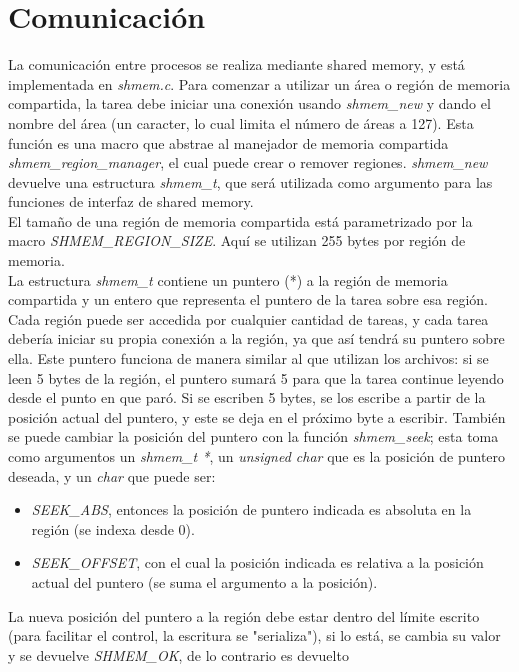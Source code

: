 \documentclass[a4paper]{article}
\begin{document}
\section{Comunicación}
La comunicación entre procesos se realiza mediante shared memory, y
está implementada en \textit{shmem.c}. Para comenzar a utilizar un área
o región de memoria compartida, la tarea debe iniciar una conexión
usando \textit{shmem\_new} y dando el nombre del área (un caracter,
lo cual limita el número de áreas a 127). Esta función es una macro
que abstrae al manejador de memoria compartida
\textit{shmem\_region\_manager}, el cual puede crear o remover
regiones. \textit{shmem\_new} devuelve una estructura
\textit{shmem\_t}, que ser\'a utilizada como argumento para las
funciones de interfaz de shared memory. \\
El tamaño de una región de memoria compartida está parametrizado
por la macro \textit{SHMEM\_REGION\_SIZE}. Aquí se utilizan 255
bytes por región de memoria. \\
La estructura \textit{shmem\_t} contiene un puntero (*) a la región
de memoria compartida y un entero que representa el puntero de la
tarea sobre esa región. Cada región puede ser accedida por
cualquier cantidad de tareas, y cada tarea
debería iniciar su propia conexión a la región, ya que así tendrá
su puntero sobre ella. Este puntero funciona de manera similar al
que utilizan los archivos: si se leen 5 bytes de la región, el
puntero sumará 5 para que la tarea continue leyendo desde el punto
en que paró. Si se escriben 5 bytes, se los escribe a partir de la
posición actual del puntero, y este se deja en el próximo byte a
escribir. También se puede cambiar la posición del puntero con la
función \textit{shmem\_seek}; esta toma como argumentos un 
\textit{shmem\_t *}, un \textit{unsigned char} que es la posición
de puntero deseada, y un \textit{char} que puede ser:
\begin{itemize}
    \item \textit{SEEK\_ABS}, entonces la posición de puntero
    indicada es absoluta en la región (se indexa desde 0).
    \item \textit{SEEK\_OFFSET}, con el cual la posición indicada
    es relativa a la posición actual del puntero (se suma el
    argumento a la posición).
\end{itemize}
La nueva posición del puntero a la región debe estar dentro del
límite escrito (para facilitar el control, la escritura se
"serializa"), si lo está, se cambia su valor y se devuelve
\textit{SHMEM\_OK}, de lo contrario es devuelto
\end{document}
